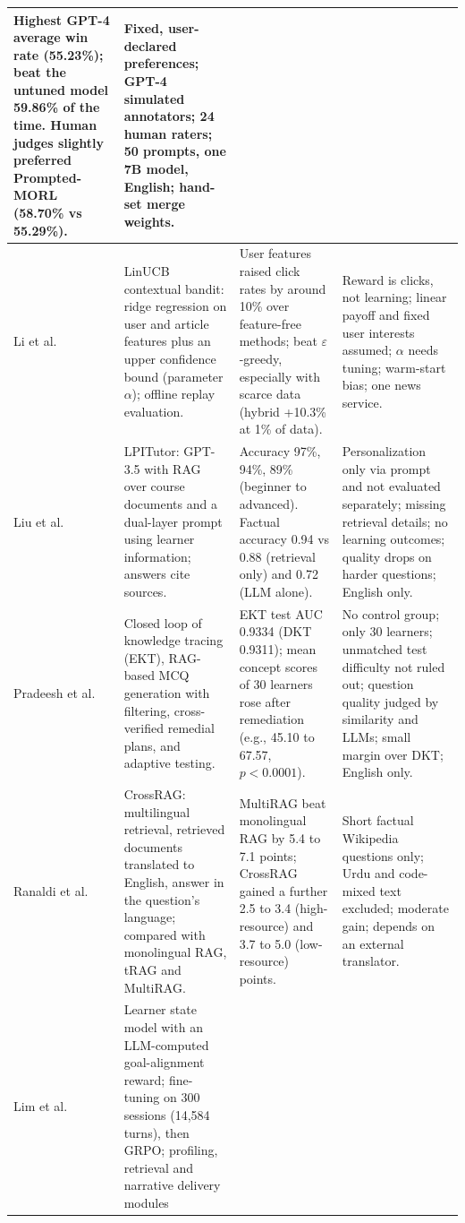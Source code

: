 \documentclass{FastFyp}
\begin{document}
\begin{small}
\begin{longtable}{|>{\raggedright\arraybackslash}p{2.4cm}|>{\raggedright\arraybackslash}p{4.1cm}|>{\raggedright\arraybackslash}p{4.1cm}|>{\raggedright\arraybackslash}p{3.6cm}|}
Highest GPT-4 average win rate (55.23\%); beat the untuned model 59.86\% of the time. Human judges slightly preferred Prompted-MORL (58.70\% vs 55.29\%). &
Fixed, user-declared preferences; GPT-4 simulated annotators; 24 human raters; 50 prompts, one 7B model, English; hand-set merge weights. \\
\hline
Li et al. \cite{li2010contextual} &
LinUCB contextual bandit: ridge regression on user and article features plus an upper confidence bound (parameter $\alpha$); offline replay evaluation. &
User features raised click rates by around 10\% over feature-free methods; beat $\varepsilon$-greedy, especially with scarce data (hybrid +10.3\% at 1\% of data). &
Reward is clicks, not learning; linear payoff and fixed user interests assumed; $\alpha$ needs tuning; warm-start bias; one news service. \\
\hline
Liu et al. \cite{liu2025lpitutor} &
LPITutor: GPT-3.5 with RAG over course documents and a dual-layer prompt using learner information; answers cite sources. &
Accuracy 97\%, 94\%, 89\% (beginner to advanced). Factual accuracy 0.94 vs 0.88 (retrieval only) and 0.72 (LLM alone). &
Personalization only via prompt and not evaluated separately; missing retrieval details; no learning outcomes; quality drops on harder questions; English only. \\
\hline
Pradeesh et al. \cite{pradeesh2025aidriven} &
Closed loop of knowledge tracing (EKT), RAG-based MCQ generation with filtering, cross-verified remedial plans, and adaptive testing. &
EKT test AUC 0.9334 (DKT 0.9311); mean concept scores of 30 learners rose after remediation (e.g., 45.10 to 67.57, $p<0.0001$). &
No control group; only 30 learners; unmatched test difficulty not ruled out; question quality judged by similarity and LLMs; small margin over DKT; English only. \\
\hline
Ranaldi et al. \cite{ranaldi2026multilingual} &
CrossRAG: multilingual retrieval, retrieved documents translated to English, answer in the question's language; compared with monolingual RAG, tRAG and MultiRAG. &
MultiRAG beat monolingual RAG by 5.4 to 7.1 points; CrossRAG gained a further 2.5 to 3.4 (high-resource) and 3.7 to 5.0 (low-resource) points. &
Short factual Wikipedia questions only; Urdu and code-mixed text excluded; moderate gain; depends on an external translator. \\
\hline
Lim et al. \cite{lim2026pxplore} &
Learner state model with an LLM-computed goal-alignment reward; fine-tuning on 300 sessions (14,584 turns), then GRPO; profiling, retrieval and narrative delivery modules &

\end{longtable}
\end{small}
\end{document}

